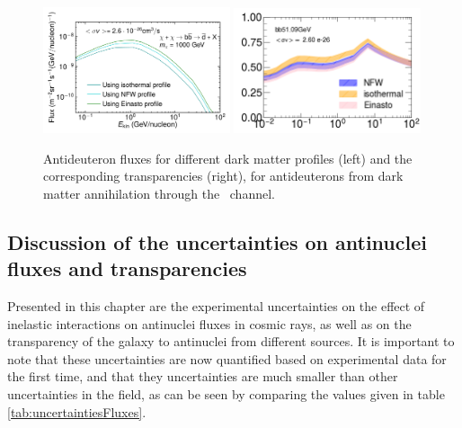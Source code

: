\begin{figure}[hbtp]
    \centering
    \includegraphics[width=0.49\textwidth]{figures/bbdbarPaperLISDiffProfiles.pdf}
    \includegraphics[width=0.49\textwidth]{figures/Transparency_comparison_DM_profiles_bb51GeV_DMXs_option_nominal.png}
    \caption{Antideuteron fluxes for different dark matter profiles (left) and the corresponding transparencies (right), for antideuterons from dark matter annihilation through the \bb\ channel.}
    \label{fig:different_DM_profiles_and_transparencies}
\end{figure}

\subsection{Discussion of the uncertainties on antinuclei fluxes and transparencies}
Presented in this chapter are the experimental uncertainties on the effect of inelastic interactions on antinuclei fluxes in cosmic rays, as well as on the transparency of the galaxy to antinuclei from different sources. It is important to note that these uncertainties are now quantified based on experimental data for the first time, and that they uncertainties are much smaller than other uncertainties in the field, as can be seen by comparing the values given in table \ref{tab:uncertaintiesFluxes}. \\


